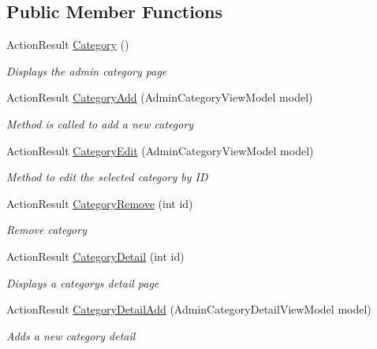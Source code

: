 \subsection*{Public Member Functions}
\begin{DoxyCompactItemize}
\item 
Action\+Result \mbox{\hyperlink{class_ox_tots_1_1_controllers_1_1_admin_controller_ac38aae229fe5869fe0d6ac580c858514}{Category}} ()
\begin{DoxyCompactList}\small\item\em Displays the admin category page \end{DoxyCompactList}\item 
Action\+Result \mbox{\hyperlink{class_ox_tots_1_1_controllers_1_1_admin_controller_a8391a76834fbfc7dcf925155044e5052}{Category\+Add}} (Admin\+Category\+View\+Model model)
\begin{DoxyCompactList}\small\item\em Method is called to add a new category \end{DoxyCompactList}\item 
Action\+Result \mbox{\hyperlink{class_ox_tots_1_1_controllers_1_1_admin_controller_a1065f8741cd20be9825bdb06f5aa075e}{Category\+Edit}} (Admin\+Category\+View\+Model model)
\begin{DoxyCompactList}\small\item\em Method to edit the selected category by ID \end{DoxyCompactList}\item 
Action\+Result \mbox{\hyperlink{class_ox_tots_1_1_controllers_1_1_admin_controller_a5a5526ec01691eded66fa9aee851639c}{Category\+Remove}} (int id)
\begin{DoxyCompactList}\small\item\em Remove category \end{DoxyCompactList}\item 
Action\+Result \mbox{\hyperlink{class_ox_tots_1_1_controllers_1_1_admin_controller_a6eba9f7bd9b3e167cf0f9fbc1eff1a23}{Category\+Detail}} (int id)
\begin{DoxyCompactList}\small\item\em Displays a category\textquotesingle{}s detail page \end{DoxyCompactList}\item 
Action\+Result \mbox{\hyperlink{class_ox_tots_1_1_controllers_1_1_admin_controller_a2991fd1b26f3f2b5f655be11195fecef}{Category\+Detail\+Add}} (Admin\+Category\+Detail\+View\+Model model)
\begin{DoxyCompactList}\small\item\em Adds a new category detail \end{DoxyCompactList}\item 

\end{DoxyCompactItemize}
